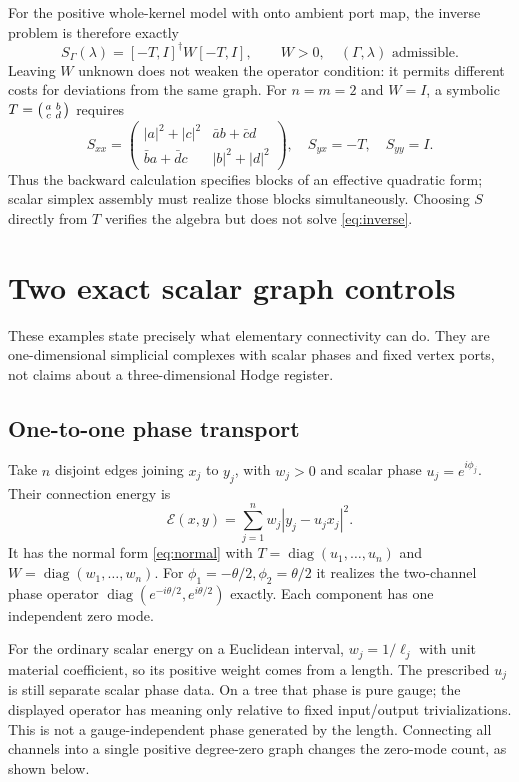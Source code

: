 \documentclass[11pt]{article}
\theoremstyle{definition}
\newcommand{\diag}{\operatorname{diag}}
\begin{document}
For the positive whole-kernel model with onto ambient port map, the
inverse problem is therefore exactly
\begin{equation}\label{eq:inverse}
 S_\Gamma(\lambda)=[-T,I]^\dagger W[-T,I],
 \qquad W>0,\quad(\Gamma,\lambda)\text{ admissible}.
\end{equation}
Leaving $W$ unknown does not weaken the operator condition: it permits
different costs for deviations from the same graph.
For $n=m=2$ and $W=I$, a symbolic
$T=\begin{psmallmatrix}a&b\\c&d\end{psmallmatrix}$ requires
\[
 S_{xx}=
 \begin{pmatrix}|a|^2+|c|^2&\bar a b+\bar c d\\
                \bar b a+\bar d c&|b|^2+|d|^2\end{pmatrix},
 \quad S_{yx}=-T,\quad S_{yy}=I.
\]
Thus the backward calculation specifies blocks of an effective
quadratic form; scalar simplex assembly must realize those blocks
simultaneously. Choosing $S$ directly from $T$ verifies the algebra
but does not solve \eqref{eq:inverse}.

\section{Two exact scalar graph controls}\label{sec:controls}
These examples state precisely what elementary connectivity can do.
They are one-dimensional simplicial complexes with scalar phases and
fixed vertex ports, not claims about a three-dimensional Hodge register.

\subsection{One-to-one phase transport}
Take $n$ disjoint edges joining $x_j$ to $y_j$, with $w_j>0$ and
scalar phase $u_j=e^{i\phi_j}$. Their connection energy is
\[
 \mathcal E(x,y)=\sum_{j=1}^n w_j|y_j-u_jx_j|^2.
\]
It has the normal form \eqref{eq:normal} with
$T=\diag(u_1,\ldots,u_n)$ and $W=\diag(w_1,\ldots,w_n)$.
For $\phi_1=-\theta/2,\phi_2=\theta/2$ it realizes the two-channel
phase operator $\diag(e^{-i\theta/2},e^{i\theta/2})$ exactly.
Each component has one independent zero mode.

For the ordinary scalar energy on a Euclidean interval,
$w_j=1/\ell_j$ with unit material coefficient, so its positive weight
comes from a length. The prescribed $u_j$ is still separate scalar
phase data. On a tree that phase is pure gauge; the displayed operator
has meaning only relative to fixed input/output trivializations.
This is not a gauge-independent phase generated by the length.
Connecting all channels into a single positive degree-zero graph
changes the zero-mode count, as shown below.
\end{document}
